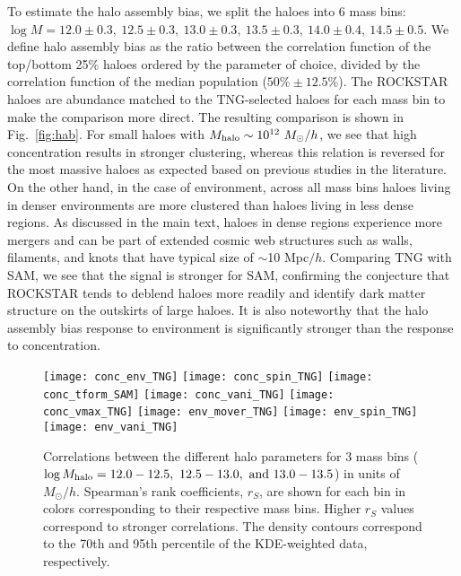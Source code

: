 \documentclass[fleqn,usenatbib]{mnras}
\newcommand{\rss}[1]{\textcolor{purple}{(rss: #1)}}
\begin{document}
To estimate the halo assembly bias, we split the haloes into 6 mass bins: $\log M = 12.0\pm0.3, \ 12.5\pm0.3, \ 13.0\pm0.3, \ 13.5\pm0.3, \ 14.0\pm0.4, \ 14.5\pm0.5$. We define halo assembly bias as the ratio between the correlation function of the top/bottom 25\% haloes ordered by the parameter of choice, divided by the correlation function of the median population ($50\%\pm12.5\%$). The ROCKSTAR haloes are abundance matched to the TNG-selected haloes for each mass bin to make the comparison more direct. 
The resulting comparison is shown in Fig.~\ref{fig:hab}. For small haloes with $M_{\rm halo} \sim 10^{12} \ {M_\odot/h}$, we see that high concentration results in stronger clustering, whereas this relation is reversed for the most massive haloes as expected based on previous studies in the literature. On the other hand, in the case of environment, across all mass bins haloes living in denser environments are more clustered than haloes living in less dense regions. As discussed in the main text, haloes in dense regions experience more mergers and can be part of extended cosmic web structures such as walls, filaments, and knots that have typical size of $\sim$10 Mpc$/h$. Comparing TNG with SAM, we see that the signal is stronger for SAM, confirming the conjecture that \textsc{ROCKSTAR} tends to deblend haloes more readily and identify dark matter structure on the outskirts of large haloes. It is also noteworthy that the halo assembly bias response to environment is significantly stronger than the response to concentration.

\begin{figure*}
\centering  
\texttt{[image: conc\_env\_TNG]}\hspace{0.1\textwidth}
\texttt{[image: conc\_spin\_TNG]}
\texttt{[image: conc\_tform\_SAM]}\hspace{0.1\textwidth}
\texttt{[image: conc\_vani\_TNG]}
\texttt{[image: conc\_vmax\_TNG]}\hspace{0.1\textwidth}
\texttt{[image: env\_mover\_TNG]}
\texttt{[image: env\_spin\_TNG]}\hspace{0.1\textwidth}
\texttt{[image: env\_vani\_TNG]}
\caption{Correlations between the different halo parameters for 3 mass bins ($\log M_{\rm halo} = 12.0 - 12.5, \ 12.5 - 13.0, \ {\rm and} \ 13.0 - 13.5$) in units of $M_\odot/h$. Spearman's rank coefficients, $r_S$, are shown for each bin in colors corresponding to their respective mass bins. Higher $r_S$ values correspond to stronger correlations. The density contours correspond to the 70th and 95th percentile of the KDE-weighted data, respectively.
}
\label{fig:halo_corr}
\end{figure*}
\end{document}
